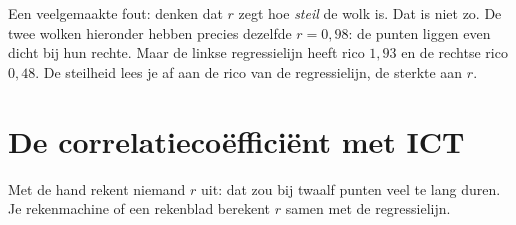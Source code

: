 \begin{oefeningen}
\end{oefeningen}

Een veelgemaakte fout: denken dat $r$ zegt hoe \textit{steil} de wolk is. Dat is niet zo. De twee wolken hieronder hebben precies dezelfde $r = 0,98$: de punten liggen even dicht bij hun rechte. Maar de linkse regressielijn heeft rico $1,93$ en de rechtse rico $0,48$. De steilheid lees je af aan de rico van de regressielijn, de sterkte aan $r$.


\section{De correlatiecoëfficiënt met ICT}

Met de hand rekent niemand $r$ uit: dat zou bij twaalf punten veel te lang duren. Je rekenmachine of een rekenblad berekent $r$ samen met de regressielijn.

